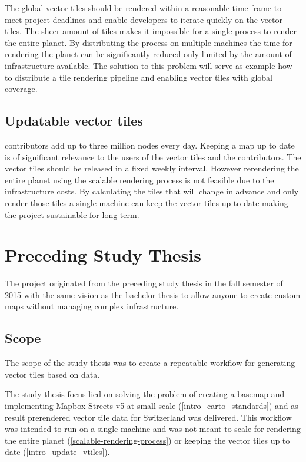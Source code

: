 The global vector tiles should be rendered within a reasonable time-frame
to meet project deadlines and enable developers to iterate quickly on the vector tiles.
The sheer amount of tiles makes it impossible for a single process to render the entire planet.
By distributing the process on multiple machines the time for rendering the planet can be significantly reduced only limited
by the amount of infrastructure available. The solution to this problem will serve as example how to distribute a tile rendering pipeline and enabling
vector tiles with global coverage.

\subsection{Updatable vector tiles}\label{intro_update_vtiles}

\osm{} contributors add up to three million nodes every day\cite{osm_wiki_2016}. Keeping a map up to date is of significant relevance to the users of the vector tiles and the contributors. The vector tiles should be released in a fixed weekly interval.
However rerendering the entire planet using the scalable rendering process is not feasible due to the infrastructure costs. By calculating the tiles that will change in advance and only render those tiles a single machine can keep the vector tiles up to date making the project sustainable for long term. 

\section{Preceding Study Thesis}\label{part1_scope_of_study_thesis}

The \osmvt{} project originated from the preceding study thesis in the fall semester of 2015 with the same vision as the bachelor thesis to allow anyone to create custom \osm{} maps without managing complex infrastructure. 

\subsection{Scope}\label{part1_scope}

The scope of the study thesis was to create a repeatable workflow for generating vector tiles based on \osm{} data. 

The study thesis focus lied on solving the problem of creating a basemap and implementing Mapbox Streets v5 at small scale (\autoref{intro_carto_standards}) and as result prerendered vector tile data for Switzerland was delivered.
This workflow was intended to run on a single machine and was not meant to scale for rendering the entire planet (\autoref{scalable-rendering-process}) or keeping the vector tiles up to date (\autoref{intro_update_vtiles}).


